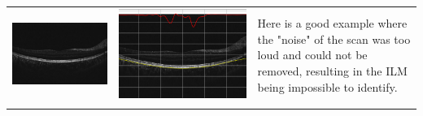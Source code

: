 \documentclass[12pt,a4paper]{scrartcl}
\begin{document}
\begin{table}[H]
\begin{tabular}{ | m{5cm} | m{5cm} | m{5cm} | }
\begin{minipage}{.3\textwidth}
    \end{minipage}
    \\ \hline%
    \begin{minipage}{.3\textwidth}
      \includegraphics[width=\linewidth]{./images/TableOCT/base5.jpeg}
    \end{minipage}
    &
     \begin{minipage}{.3\textwidth}
      \includegraphics[width=\linewidth]{./images/TableOCT/ILM_BM_5.png}
    \end{minipage}
    & 
     Here  is a good example where the "noise" of the scan was too loud and could not be removed, resulting in the ILM being impossible to identify.
    \\ \hline%
    \begin{minipage}{.3\textwidth}

\end{minipage}
\end{tabular}
\end{table}
\end{document}

